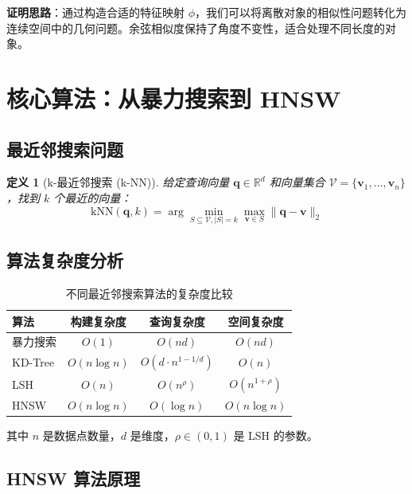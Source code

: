 \documentclass[12pt,a4paper]{article}
\newtheorem{definition}{定义}[section]
\begin{document}
\textbf{证明思路}：通过构造合适的特征映射 $\phi$，我们可以将离散对象的相似性问题转化为连续空间中的几何问题。余弦相似度保持了角度不变性，适合处理不同长度的对象。

\section{核心算法：从暴力搜索到 HNSW}

\subsection{最近邻搜索问题}

\begin{definition}[k-最近邻搜索 (k-NN)]
给定查询向量 $\mathbf{q} \in \mathbb{R}^d$ 和向量集合 $\mathcal{V} = \{\mathbf{v}_1, \ldots, \mathbf{v}_n\}$，找到 $k$ 个最近的向量：
\begin{equation}
\text{kNN}(\mathbf{q}, k) = \arg\min_{S \subseteq \mathcal{V}, |S|=k} \max_{\mathbf{v} \in S} \|\mathbf{q} - \mathbf{v}\|_2
\end{equation}
\end{definition}

\subsection{算法复杂度分析}

\begin{table}[h]
\centering
\begin{tabular}{@{}lccc@{}}
\toprule
\textbf{算法} & \textbf{构建复杂度} & \textbf{查询复杂度} & \textbf{空间复杂度} \\
\midrule
暴力搜索 & $O(1)$ & $O(nd)$ & $O(nd)$ \\
KD-Tree & $O(n \log n)$ & $O(d \cdot n^{1-1/d})$ & $O(n)$ \\
LSH & $O(n)$ & $O(n^\rho)$ & $O(n^{1+\rho})$ \\
HNSW & $O(n \log n)$ & $O(\log n)$ & $O(n \log n)$ \\
\bottomrule
\end{tabular}
\caption{不同最近邻搜索算法的复杂度比较}
\end{table}

其中 $n$ 是数据点数量，$d$ 是维度，$\rho \in (0,1)$ 是 LSH 的参数。

\subsection{HNSW 算法原理}
\end{document}
